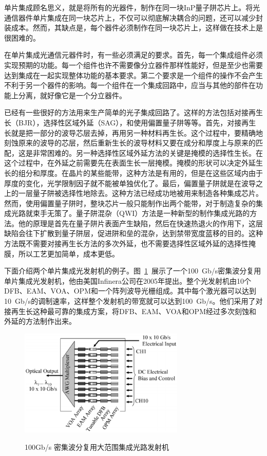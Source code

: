 \documentclass{ZJUthesis}
\begin{document}
单片集成顾名思义，就是将所有的光器件，制作在同一块InP量子阱芯片上。将光通信器件单片集成在同一块芯片上，不仅可以彻底解决耦合的问题，还可以减少封装成本。然而，其缺点是，每个器件必须制作在同一块芯片上，这样做在技术上是很困难的。

在单片集成光通信元器件时，有一些必须满足的要求。首先，每一个集成组件必须实现预期的功能。每一个组件也许不需要像分立器件那样性能好，但是至少也需要达到集成在一起实现整体功能的基本要求。第二个要求是一个组件的操作不会产生不利于另一个器件的影响。每一个组件在一个集成回路中，应当与其他的部件在功能上分离，就好像它是一个分立器件。

已经有一些很好的方法用来生产简单的光子集成回路了。这样的方法包括对接再生长（BJR）\cite{Binsma1997Characterization}，选择性区域外延（SAG）\cite{Aoki1993InGaAs}，和使用偏置量子阱\cite{Mason1999Widely}等等。首先，对接再生长就是把一部分的波导芯层去掉，再用另一种材料再生长。这个过程中，要精确地刻蚀原来的波导的芯层，然后重新生长的波导材料又要在成分和厚度上与原来的匹配，这是非常困难的。另一种选择性区域外延方法的关键是掩模的选择性生长。在这个过程中，在外延之前需要先在表面生长一层掩模。掩模的形状可以决定外延生长的组分和厚度。在晶片的某些能带，这种方法是有用的，但是在这些区域内由于厚度的变化，光学限制因子就不能被单独优化了。最后，偏置量子阱就是在波导之上的一层量子阱被选择性地除去。这种方法已经成功地被用来制造各种集成芯片\cite{Mason2000Design}\cite{Mason1998Tunable}\cite{Fish1998Compact}。然而，使用偏置量子阱时，整块芯片一般只能制作出两个能带，对于制造复杂的集成光路就束手无策了。量子阱混杂（QWI）\cite{Marsh1993Quantum}方法是一种新型的制作集成光路的方法。他的原理是首先在量子阱片表面产生缺陷，然后在快速热退火的作用下，这层缺陷会往下扩散到量子阱层，促进阱和垒的混杂，达到禁带宽度蓝移的目的。这种方法既不需要对接再生长方法的多次外延，也不需要选择性区域外延的选择性掩膜，所以工艺更加简单，成本更低。

下面介绍两个单片集成光发射机的例子。图~\ref{fig_infinera}~展示了一个100~Gb/s密集波分复用单片集成光发射机，他由美国Infinera公司在2005年提出\cite{Nagarajan2005Large}。整个光发射机由10个DFB、EAM、VOA、OPM和一个阵列波导光栅组成。其中每个激光器可以达到10~Gb/s的调制速率，这样整个发射机的带宽就可以达到100~Gb/s。他们采用了对接再生长这种最可靠的集成方案，将DFB、EAM、VOA和OPM经过多次刻蚀和外延的方法制作出来。

\begin{figure}[htbp]
  \centering
  \includegraphics[width=0.7\textwidth]{./Pictures/infinera.eps}\\
  \caption{100Gb/s 密集波分复用大范围集成光路发射机\cite{Nagarajan2005Large}}
  \label{fig_infinera}
\end{figure}
\end{document}
